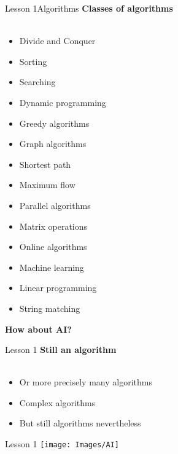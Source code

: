 \documentclass[aspectratio=1610]{beamer}
\begin{document}
\begin{frame}{Lesson 1}{Algorithms}
\Large
\textbf{Classes of algorithms}\\~\\ 
    \begin{multicols}{3}
    \begin{itemize}
        \item Divide and Conquer
        \item Sorting
        \item Searching
        \item Dynamic programming
        \item Greedy algorithms
        \item Graph algorithms
        \item Shortest path
        \item Maximum flow
        \item Parallel algorithms
        \item Matrix operations
        \item Online algorithms
        \item Machine learning
        \item Linear programming
        \item String matching
    \end{itemize}
    \end{multicols}
\end{frame}


\begin{frame}
\begin{center}
\Huge 
\textbf { How about AI? }
\end{center}
\end{frame}


\begin{frame}{Lesson 1}{}
\LARGE
\textbf {Still an algorithm\\~\\}
\begin{itemize}
    \item Or more precisely many algorithms
    \item Complex algorithms
    \item But still algorithms nevertheless 
 \end{itemize}
\end{frame}


\begin{frame}{Lesson 1}{}
\texttt{[image: Images/AI]}
\end{frame}
\end{document}
